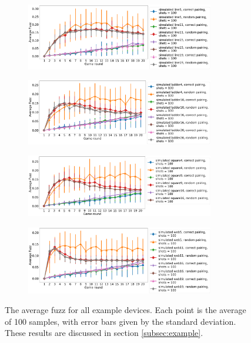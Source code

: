 \documentclass[aps,prl,twocolumn,showpacs,preprintnumbers]{revtex4-1}
\begin{document}
\begin{figure}
    \centering
    \begin{subfigure}[b]{\textwidth}
        \includegraphics[width=0.9\textwidth]{figures/line_fuzz.png}
    \end{subfigure}
    \begin{subfigure}[b]{\textwidth}
        \includegraphics[width=0.9\textwidth]{figures/ladder_fuzz.png}
    \end{subfigure}
    \begin{subfigure}[b]{\textwidth}
        \includegraphics[width=0.9\textwidth]{figures/square_fuzz.png}
    \end{subfigure}
    \begin{subfigure}[b]{\textwidth}
        \includegraphics[width=0.9\textwidth]{figures/web_fuzz.png}
    \end{subfigure}
    \caption{The average fuzz for all example devices. Each point is the average of 100 samples, with error bars given by the standard deviation. These results are discussed in section \ref{subsec:example}.}\label{fig:example_fuzz}
\end{figure}
\pagebreak
\end{document}
